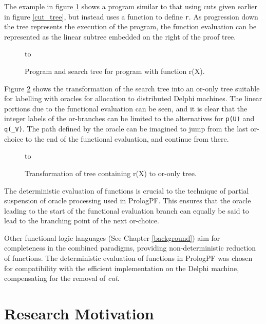 The example in figure \ref{fun_tree3} shows a program similar to that using cuts given
earlier in figure \ref{cut_tree}, but instead uses a function to define \texttt{r}.
As progression down the tree represents the execution of the program, the function
evaluation can be represented as the linear subtree embedded on the right of the
proof tree.

\begin{figure}[h]
\vspace{5mm} \hbox to 
\caption{Program and search tree for program with function r(X).}
\vspace{5mm}
\label{fun_tree3}
\end{figure}

Figure \ref{fun_tree4} shows the transformation of the search tree into an
or-only tree suitable for labelling with oracles for allocation to
distributed Delphi machines.  The linear portions due to the functional evaluation
can be seen, and it is clear that the integer labels of the or-branches can
be limited to the alternatives for \texttt{p(U)} and \texttt{q(\_{}V)}. The path
defined by the oracle can be imagined to jump from the last or-choice to the
end of the functional evaluation, and continue from there.

\begin{figure}[h]
\vspace{5mm} \hbox to 
\caption{Transformation of tree containing r(X) to or-only tree.}
\vspace{5mm}
\label{fun_tree4}
\end{figure}

The deterministic evaluation of functions is crucial to the 
technique of partial suspension of
oracle processing used in PrologPF.  This ensures that the oracle leading to the 
start of the functional evaluation branch can equally be said to lead to the 
branching point of the next or-choice.

Other functional logic languages (See Chapter \ref{background}) aim for
completeness in the combined paradigms, providing non-deterministic
reduction of functions.  The deterministic evaluation of functions in PrologPF
was chosen for compatibility with the efficient implementation on the
Delphi machine, compensating for the removal of \textit{cut}.

\section{Research Motivation} %

